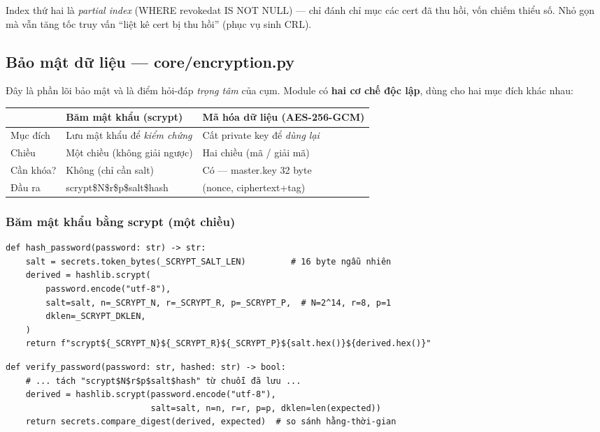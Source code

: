 \documentclass[12pt,a4paper]{article}
\newcommand{\code}[1]{{\ttfamily\small\def\_{\textunderscore\discretionary{}{}{}}#1}}
\begin{document}
\begin{notebox}
Index thứ hai là \emph{partial index} (\code{WHERE revoked\_at IS NOT NULL}) —
chỉ đánh chỉ mục các cert đã thu hồi, vốn chiếm thiểu số. Nhỏ gọn mà vẫn tăng tốc
truy vấn ``liệt kê cert bị thu hồi'' (phục vụ sinh CRL).
\end{notebox}

\subsection{Bảo mật dữ liệu — \code{core/encryption.py}}

Đây là phần lõi bảo mật và là điểm hỏi-đáp \emph{trọng tâm} của cụm. Module có
\textbf{hai cơ chế độc lập}, dùng cho hai mục đích khác nhau:

\renewcommand{\arraystretch}{1.3}
\begin{tabularx}{\linewidth}{L{3.2cm} L{4.4cm} X}
\toprule
& \textbf{Băm mật khẩu (scrypt)} & \textbf{Mã hóa dữ liệu (AES-256-GCM)} \\
\midrule
Mục đích & Lưu mật khẩu để \emph{kiểm chứng} & Cất private key để \emph{dùng lại} \\
Chiều & Một chiều (không giải ngược) & Hai chiều (mã / giải mã) \\
Cần khóa? & Không (chỉ cần salt) & Có — \code{master.key} 32 byte \\
Đầu ra & \code{scrypt\$N\$r\$p\$salt\$hash} & \code{(nonce, ciphertext+tag)} \\
\bottomrule
\end{tabularx}

\subsubsection{Băm mật khẩu bằng scrypt (một chiều)}

\begin{Verbatim}
def hash_password(password: str) -> str:
    salt = secrets.token_bytes(_SCRYPT_SALT_LEN)         # 16 byte ngẫu nhiên
    derived = hashlib.scrypt(
        password.encode("utf-8"),
        salt=salt, n=_SCRYPT_N, r=_SCRYPT_R, p=_SCRYPT_P,  # N=2^14, r=8, p=1
        dklen=_SCRYPT_DKLEN,
    )
    return f"scrypt${_SCRYPT_N}${_SCRYPT_R}${_SCRYPT_P}${salt.hex()}${derived.hex()}"
\end{Verbatim}

\begin{Verbatim}
def verify_password(password: str, hashed: str) -> bool:
    # ... tách "scrypt$N$r$p$salt$hash" từ chuỗi đã lưu ...
    derived = hashlib.scrypt(password.encode("utf-8"),
                             salt=salt, n=n, r=r, p=p, dklen=len(expected))
    return secrets.compare_digest(derived, expected)  # so sánh hằng-thời-gian
\end{Verbatim}
\end{document}
